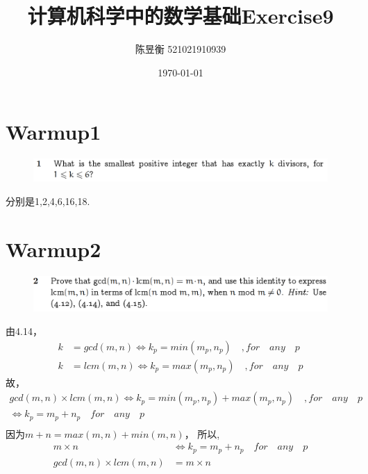 \documentclass[]{article}
\title{计算机科学中的数学基础Exercise9}
\author{陈昱衡 521021910939}
\date{\today}
\begin{document}
\maketitle


\section*{Warmup1}
\begin{figure}[H]
    \includegraphics[scale = 0.6]{2023-03-13-16-09-17.png}
\end{figure}
分别是1,2,4,6,16,18.


\section*{Warmup2}
\begin{figure}[H]
    \includegraphics[scale = 0.6]{2023-03-13-16-11-00.png}
\end{figure}
由4.14，
\begin{align}
    k &= gcd(m,n) \Leftrightarrow k_{p} = min(m_{p} , n_{p})\quad,for\quad any\quad p\\
    k &= lcm(m,n) \Leftrightarrow k_{p} = max(m_{p} , n_{p})\quad,for\quad any\quad p
\end{align}
故，
\begin{align}
    gcd(m,n) \times lcm(m,n) \Leftrightarrow k_{p} = min(m_{p},n_{p}) + max(m_{p},n_{p}) \quad,for\quad any\quad p\\
    \Leftrightarrow k_{p} = m_{p} + n_{p} \quad for\quad any\quad p\\
\end{align}
因为$m + n = max(m,n)+min(m,n)$，
所以,
\begin{align}
    m \times n &\Leftrightarrow k_{p} = m_{p} + n_{p} \quad for\quad any\quad p\\
    gcd(m,n) \times lcm(m,n) &= m \times n
\end{align}
\end{document}
